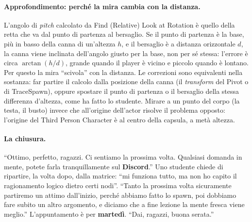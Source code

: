 \paragraph{Approfondimento: perché la mira cambia con la distanza.} L'angolo di
\emph{pitch} calcolato da Find (Relative) Look at Rotation è quello della retta che va
dal punto di partenza al bersaglio. Se il punto di partenza è la base, più in basso della
canna di un'altezza $h$, e il bersaglio è a distanza orizzontale $d$, la canna viene
inclinata dell'angolo giusto per la base, non per sé stessa: l'errore è circa
$\arctan(h/d)$, grande quando il player è vicino e piccolo quando è lontano. Per questo
la mira ``scivola'' con la distanza. Le correzioni sono equivalenti nella sostanza: far
partire il calcolo dalla posizione della canna (il \emph{transform} del Pivot o di
TraceSpawn), oppure spostare il punto di partenza o il bersaglio della stessa differenza
d'altezza, come ha fatto lo studente. Mirare a un punto del corpo (la testa, il busto)
invece che all'origine dell'actor risolve il problema opposto: l'origine del Third Person
Character è al centro della capsula, a metà altezza.

\paragraph{La chiusura.} ``Ottimo, perfetto, ragazzi. Ci sentiamo la prossima volta.
Qualsiasi domanda in mente, potete farla tranquillamente sul \textbf{Discord}.'' Uno
studente chiede di ripartire, la volta dopo, dalla matrice: ``mi funziona tutto, ma non ho
capito il ragionamento logico dietro certi nodi''. ``Tanto la prossima volta sicuramente
partiremo un attimo dall'inizio, perché abbiamo fatto lo spawn, poi dobbiamo fare subito
un altro argomento, e diciamo che a fine lezione la mente fresca viene meglio.''
L'appuntamento è per \textbf{martedì}. ``Dai, ragazzi, buona serata.''

